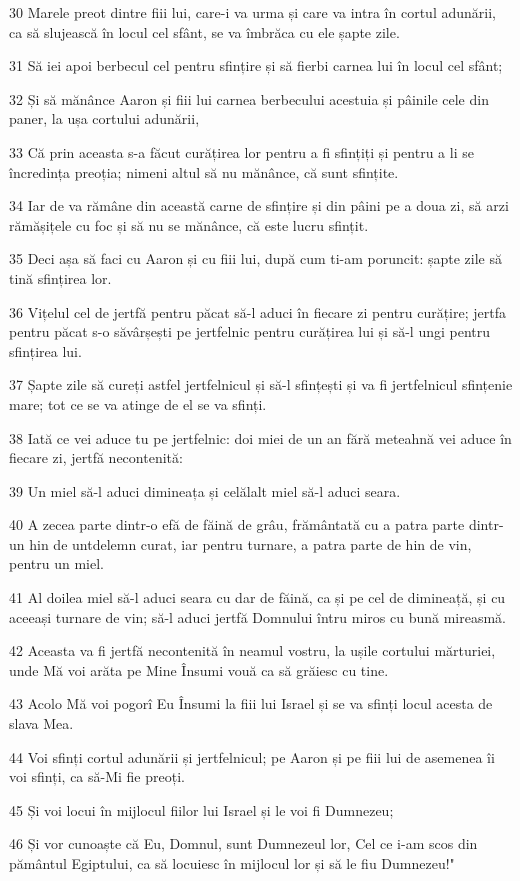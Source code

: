 \par 30 Marele preot dintre fiii lui, care-i va urma și care va intra în cortul adunării, ca să slujească în locul cel sfânt, se va îmbrăca cu ele șapte zile.
\par 31 Să iei apoi berbecul cel pentru sfințire și să fierbi carnea lui în locul cel sfânt;
\par 32 Și să mănânce Aaron și fiii lui carnea berbecului acestuia și pâinile cele din paner, la ușa cortului adunării,
\par 33 Că prin aceasta s-a făcut curățirea lor pentru a fi sfințiți și pentru a li se încredința preoția; nimeni altul să nu mănânce, că sunt sfințite.
\par 34 Iar de va rămâne din această carne de sfințire și din pâini pe a doua zi, să arzi rămășițele cu foc și să nu se mănânce, că este lucru sfințit.
\par 35 Deci așa să faci cu Aaron și cu fiii lui, după cum ti-am poruncit: șapte zile să tină sfințirea lor.
\par 36 Vițelul cel de jertfă pentru păcat să-l aduci în fiecare zi pentru curățire; jertfa pentru păcat s-o săvârșești pe jertfelnic pentru curățirea lui și să-l ungi pentru sfințirea lui.
\par 37 Șapte zile să cureți astfel jertfelnicul și să-l sfințești și va fi jertfelnicul sfințenie mare; tot ce se va atinge de el se va sfinți.
\par 38 Iată ce vei aduce tu pe jertfelnic: doi miei de un an fără meteahnă vei aduce în fiecare zi, jertfă necontenită:
\par 39 Un miel să-l aduci dimineața și celălalt miel să-l aduci seara.
\par 40 A zecea parte dintr-o efă de făină de grâu, frământată cu a patra parte dintr-un hin de untdelemn curat, iar pentru turnare, a patra parte de hin de vin, pentru un miel.
\par 41 Al doilea miel să-l aduci seara cu dar de făină, ca și pe cel de dimineață, și cu aceeași turnare de vin; să-l aduci jertfă Domnului întru miros cu bună mireasmă.
\par 42 Aceasta va fi jertfă necontenită în neamul vostru, la ușile cortului mărturiei, unde Mă voi arăta pe Mine Însumi vouă ca să grăiesc cu tine.
\par 43 Acolo Mă voi pogorî Eu Însumi la fiii lui Israel și se va sfinți locul acesta de slava Mea.
\par 44 Voi sfinți cortul adunării și jertfelnicul; pe Aaron și pe fiii lui de asemenea îi voi sfinți, ca să-Mi fie preoți.
\par 45 Și voi locui în mijlocul fiilor lui Israel și le voi fi Dumnezeu;
\par 46 Și vor cunoaște că Eu, Domnul, sunt Dumnezeul lor, Cel ce i-am scos din pământul Egiptului, ca să locuiesc în mijlocul lor și să le fiu Dumnezeu!"


